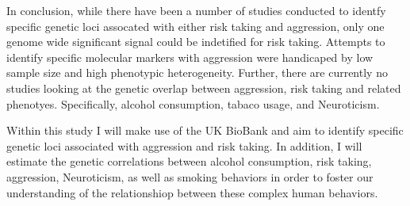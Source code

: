 In conclusion, while there have been a number of studies conducted to identfy specific genetic loci assocated  with either risk taking and aggression, only one genome wide significant signal could be indetified for risk taking.
Attempts to identify specific molecular markers with aggression were handicaped by low sample size and high phenotypic heterogeneity.
Further, there are currently no studies looking at the genetic overlap between aggression, risk taking and related phenotyes.
Specifically, alcohol consumption, tabaco usage, and Neuroticism.

Within this study I will make use of the UK BioBank and aim to identify specific genetic loci associated with aggression and risk taking.
In addition, I will estimate the genetic correlations between alcohol consumption, risk taking, aggression, Neuroticism, as well as smoking behaviors in order to foster our understanding of the relationshiop between these complex human behaviors.

